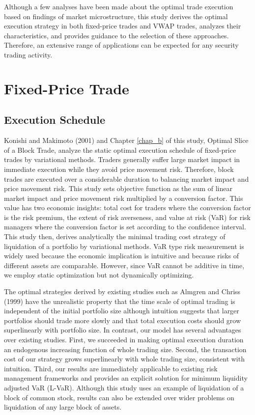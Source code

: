 Although a few analyses have been made about the optimal trade execution based on findings of market microstructure, this study derives the optimal execution strategy in both fixed-price trades and VWAP trades, analyzes their characteristics, and provides guidance to the selection of these approaches.  Therefore, an extensive range of applications can be expected for any security trading activity.


\section{Fixed-Price Trade}\label{sec_i1}
\subsection{Execution Schedule}\label{sec_i11}
Konishi and Makimoto (2001) and Chapter \ref{chap_b} of this study, Optimal Slice of a Block Trade, analyze the static optimal execution schedule of fixed-price trades by variational methods.  Traders generally suffer large market impact in immediate execution while they avoid price movement risk.  Therefore, block trades are executed over a considerable duration to balancing market impact and price movement risk.  This study sets objective function as the sum of linear market impact and price movement risk multiplied by a conversion factor.  This value has two economic insights: total cost for traders where the conversion factor is the risk premium, the extent of risk averseness, and value at risk (VaR) for risk managers where the conversion factor is set according to the confidence interval.  This study then, derives analytically the minimal trading cost strategy of liquidation of a portfolio by variational methods.  VaR type risk measurement is widely used because the economic implication is intuitive and because risks of different assets are comparable.  However, since VaR cannot be additive in time, we employ static optimization but not dynamically optimizing.  

The optimal strategies derived by existing studies such as Almgren and Chriss (1999) have the unrealistic property that the time scale of optimal trading is independent of the initial portfolio size although intuition suggests that larger portfolios should trade more slowly and that total execution costs should grow superlinearly with portfolio size.  In contrast, our model has several advantages over existing studies.  First, we succeeded in making optimal execution duration an endogenous increasing function of whole trading size.  Second, the transaction cost of our strategy grows superlinearly with whole trading size, consistent with intuition.  Third, our results are immediately applicable to existing risk management frameworks and provides an explicit solution for minimum liquidity adjusted VaR (L-VaR).  Although this study uses an example of liquidation of a block of common stock, results can also be extended over wider problems on liquidation of any large block of assets.


